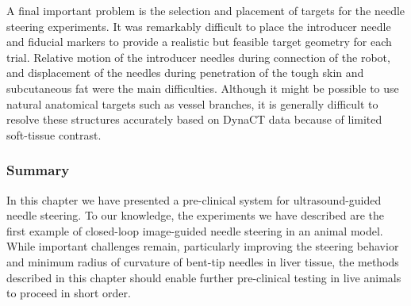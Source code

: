 A final important problem is the selection and placement of targets for the needle steering experiments. It was remarkably difficult to place the introducer needle and fiducial markers to provide a realistic but feasible target geometry for each trial. Relative motion of the introducer needles during connection of the robot, and displacement of the needles during penetration of the tough skin and subcutaneous fat were the main difficulties. Although it might be possible to use natural anatomical targets such as vessel branches, it is generally difficult to resolve these structures accurately based on DynaCT data because of limited soft-tissue contrast.

\subsubsection{Summary}
In this chapter we have presented a pre-clinical system for ultrasound-guided needle steering. To our knowledge, the experiments we have described are the first example of closed-loop image-guided needle steering in an animal model. While important challenges remain, particularly improving the steering behavior and minimum radius of curvature of bent-tip needles in liver tissue, the methods described in this chapter should enable further pre-clinical testing in live animals to proceed in short order.  

